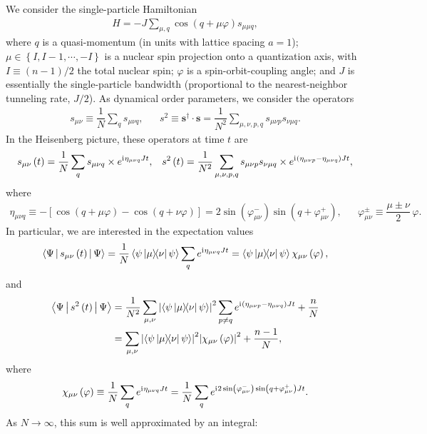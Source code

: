 \documentclass[nofootinbib,notitlepage,11pt]{revtex4-2}
\newcommand{\f}[2]{\dfrac{#1}{#2}} %
\newcommand{\p}[1]{\left(#1\right)} %
\renewcommand{\sp}[1]{\left[#1\right]} %
\renewcommand{\set}[1]{\left\{#1\right\}} %
\newcommand{\bk}{\Braket} %
\renewcommand{\v}{\bm} %
\renewcommand{\i}{\mathrm{i}\mkern1mu} %
\newcommand{\1}{\mathds{1}}
\begin{document}
We consider the single-particle Hamiltonian
\begin{align}
  H = -J \sum_{\mu,q} \cos\p{q + \mu\varphi} s_{\mu\mu q},
\end{align}
where $q$ is a quasi-momentum (in units with lattice spacing $a=1$); $\mu\in\set{I,I-1,\cdots,-I}$ is a nuclear spin projection onto a quantization axis, with $I\equiv\p{n-1}/2$ the total nuclear spin; $\varphi$ is a spin-orbit-coupling angle; and $J$ is essentially the single-particle bandwidth (proportional to the nearest-neighbor tunneling rate, $J/2$).
As dynamical order parameters, we consider the operators
\begin{align}
  s_{\mu\nu} \equiv \f1N \sum_q s_{\mu\nu q},
  &&
  s^2 \equiv \v s^\dag\cdot \v s
  = \f1{N^2} \sum_{\mu,\nu,p,q} s_{\mu\nu p} s_{\nu\mu q}.
\end{align}
In the Heisenberg picture, these operators at time $t$ are
\begin{align}
  s_{\mu\nu}\p{t} = \f1N \sum_q s_{\mu\nu q}
  \times e^{\i\eta_{\mu\nu q} J t},
  &&
  s^2\p{t} = \f1{N^2} \sum_{\mu,\nu,p,q} s_{\mu\nu p} s_{\nu\mu q}
  \times e^{\i \p{\eta_{\mu\nu p}-\eta_{\mu\nu q}} J t},
\end{align}
where
\begin{align}
  \eta_{\mu\nu q}
  \equiv -\sp{\cos\p{q+\mu\varphi} - \cos\p{q+\nu\varphi}}
  = 2 \sin\p{\varphi_{\mu\nu}^-} \sin\p{q+\varphi_{\mu\nu}^+},
  &&
  \varphi_{\mu\nu}^\pm \equiv \f{\mu\pm\nu}{2}\,\varphi.
\end{align}
In particular, we are interested in the expectation values
\begin{align}
  \bk{\Psi|s_{\mu\nu}\p{t}|\Psi}
  = \f1N \bk{\psi\op{\mu}{\nu}\psi} \sum_q e^{\i\eta_{\mu\nu q} J t}
  = \bk{\psi\op{\mu}{\nu}\psi} \chi_{\mu\nu}\p{\varphi},
\end{align}
and
\begin{align}
  \bk{\Psi|s^2\p{t}|\Psi}
  &= \f1{N^2} \sum_{\mu,\nu} \abs{\bk{\psi\op{\mu}{\nu}\psi}}^2
  \sum_{p\ne q} e^{\i\p{\eta_{\mu\nu p}-\eta_{\mu\nu q}} J t} + \f{n}{N} \\
  &= \sum_{\mu,\nu} \abs{\bk{\psi\op{\mu}{\nu}\psi}}^2
  \abs{\chi_{\mu\nu}\p{\varphi}}^2 + \f{n-1}{N},
\end{align}
where
\begin{align}
  \chi_{\mu\nu}\p{\varphi} \equiv \f1N \sum_q e^{\i\eta_{\mu\nu q} J t}
  = \f1N \sum_q e^{\i 2\sin\p{\varphi_{\mu\nu}^-} \sin\p{q+\varphi_{\mu\nu}^+} J t}.
\end{align}
As $N\to\infty$, this sum is well approximated by an integral:
\end{document}
